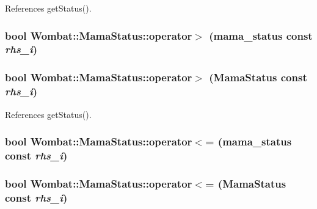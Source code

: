 References getStatus().\hypertarget{classWombat_1_1MamaStatus_a619bd3813e7ee867d4d119e613a3de62}{
\subsubsection[{operator$>$}]{\setlength{\rightskip}{0pt plus 5cm}bool Wombat::MamaStatus::operator$>$ (mama\_\-status const  {\em rhs\_\-i})}}
\label{classWombat_1_1MamaStatus_a619bd3813e7ee867d4d119e613a3de62}
\hypertarget{classWombat_1_1MamaStatus_a6e7e43173070445fd00008e30ebe528c}{
\subsubsection[{operator$>$}]{\setlength{\rightskip}{0pt plus 5cm}bool Wombat::MamaStatus::operator$>$ ({\bf MamaStatus} const  {\em rhs\_\-i})}}
\label{classWombat_1_1MamaStatus_a6e7e43173070445fd00008e30ebe528c}


References getStatus().\hypertarget{classWombat_1_1MamaStatus_a63e384ea83f45eabd80fee0d23bd9d45}{
\subsubsection[{operator$<$=}]{\setlength{\rightskip}{0pt plus 5cm}bool Wombat::MamaStatus::operator$<$= (mama\_\-status const  {\em rhs\_\-i})}}
\label{classWombat_1_1MamaStatus_a63e384ea83f45eabd80fee0d23bd9d45}
\hypertarget{classWombat_1_1MamaStatus_ab4c58d61bee325a9f373ab2a4020cd33}{
\subsubsection[{operator$<$=}]{\setlength{\rightskip}{0pt plus 5cm}bool Wombat::MamaStatus::operator$<$= ({\bf MamaStatus} const  {\em rhs\_\-i})}}
\label{classWombat_1_1MamaStatus_ab4c58d61bee325a9f373ab2a4020cd33}


